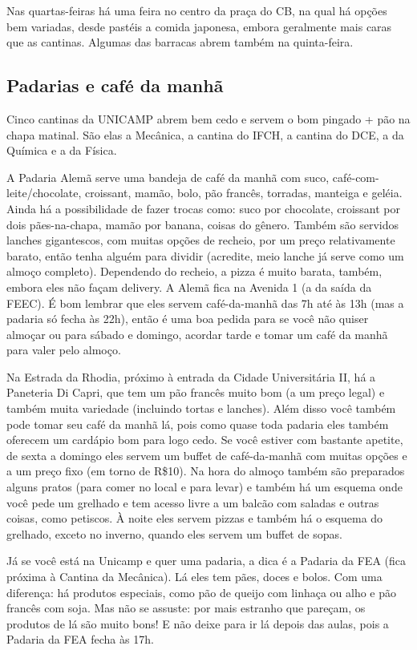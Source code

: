 \documentclass[a4paper,10pt, twocolumn]{article}
\begin{document}
Nas quartas-feiras há uma feira no centro da praça do CB, na qual há opções bem
variadas, desde pastéis a comida japonesa, embora geralmente mais caras que as
cantinas. Algumas das barracas abrem também na quinta-feira.

\subsection{Padarias e café da manhã}
Cinco cantinas da UNICAMP abrem bem cedo e servem o bom pingado + pão na chapa
matinal. São elas a Mecânica, a cantina do IFCH, a cantina do DCE, a da Química
e a da Física.

A Padaria Alemã serve uma bandeja de café da manhã com suco,
café-com-leite/chocolate, croissant, mamão, bolo, pão francês, torradas,
manteiga e geléia. Ainda há a possibilidade de fazer trocas como: suco por
chocolate, croissant por dois pães-na-chapa, mamão por banana, coisas do gênero.
Também são servidos lanches gigantescos, com muitas opções de recheio, por um
preço relativamente barato, então tenha alguém para dividir (acredite, meio
lanche já serve como um almoço completo). Dependendo do recheio, a pizza é muito
barata, também, embora eles não façam delivery. A Alemã fica na Avenida 1 (a da
saída da FEEC). É bom lembrar que eles servem café-da-manhã das 7h até às 13h
(mas a padaria só fecha às 22h), então é uma boa pedida para se você não quiser
almoçar ou para sábado e domingo, acordar tarde e tomar um café da manhã para
valer pelo almoço.

Na Estrada da Rhodia, próximo à entrada da Cidade Universitária II, há
a Paneteria Di Capri, que tem um pão francês muito bom (a um preço legal)
e também muita variedade (incluindo tortas e lanches). Além disso você também
pode tomar seu café da manhã lá, pois como quase toda padaria eles também
oferecem um cardápio bom para logo cedo. Se você estiver com bastante apetite,
de sexta a domingo eles servem um buffet de café-da-manhã com muitas opções
e a um preço fixo (em torno de R\$10). Na hora do almoço também são preparados
alguns pratos (para comer no local e para levar) e também há um esquema onde
você pede um grelhado e tem acesso livre a um balcão com saladas e outras
coisas, como petiscos. À noite eles servem pizzas e também há o esquema do
grelhado, exceto no inverno, quando eles servem um buffet de sopas.

Já se você está na Unicamp e quer uma padaria, a dica é a Padaria da FEA (fica
próxima à Cantina da Mecânica). Lá eles tem pães, doces e bolos. Com uma
diferença: há produtos especiais, como pão de queijo com linhaça ou alho e pão
francês com soja. Mas não se assuste: por mais estranho que pareçam, os produtos
de lá são muito bons! E não deixe para ir lá depois das aulas, pois a Padaria da
FEA fecha às 17h.
\end{document}

